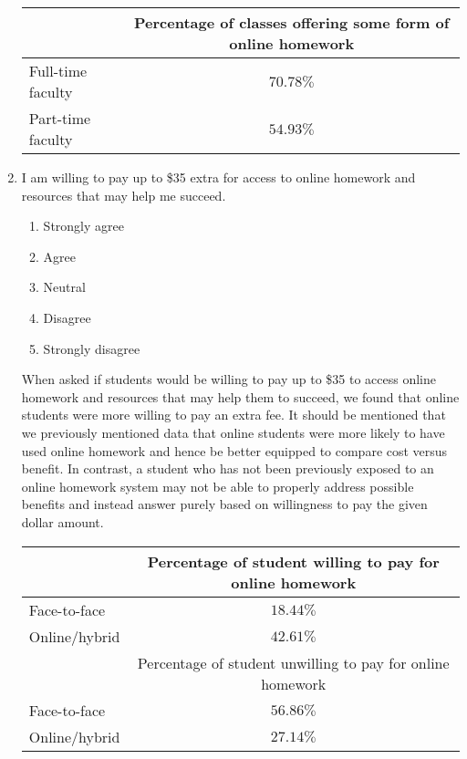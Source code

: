\begin{enumerate}
	\begin{tabular}{lc}
		\toprule
		                  & Percentage of classes offering some form of online homework \\
		\midrule
		Full-time faculty & $70.78\%$                                                   \\
		Part-time faculty & $54.93\%$                                                   \\
		\bottomrule
	\end{tabular}
	\item I am willing to pay up to \$35 extra for access to online homework and resources that may help me succeed.
	\begin{enumerate}
		\item Strongly agree
		\item Agree
		\item Neutral
		\item Disagree
		\item Strongly disagree
	\end{enumerate}
	When asked if students would be willing to pay up to \$35 to access online homework and resources that may help them to succeed, we found that online students were more willing to pay an extra fee. It should be mentioned that we previously mentioned data that online students were more likely to have used online homework and hence be better equipped to compare cost versus benefit. In contrast, a student who has not been previously exposed to an online homework system may not be able to properly address possible benefits and instead answer purely based on willingness to pay the given dollar amount. 
	    
	\begin{tabular}{lc}
		\toprule
		              & Percentage of student willing to pay for online homework   \\
		\midrule
		Face-to-face  & $18.44\%$                                                  \\
		Online/hybrid & $42.61\%$                                                  \\
		\cmidrule{2-2}
		              & Percentage of student unwilling to pay for online homework \\
		\cmidrule{2-2}
		Face-to-face  & $56.86\%$                                                  \\
		Online/hybrid & $27.14\%$                                                  \\
		\bottomrule
	\end{tabular}
	

\end{enumerate}
